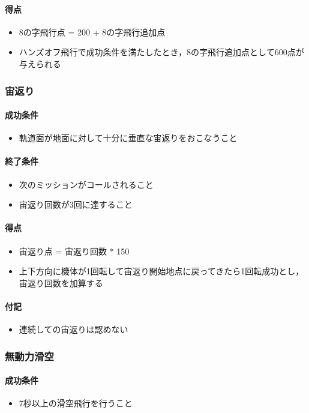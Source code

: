 \paragraph{得点}
\begin{itemize}
\item 8の字飛行点 = 200 + 8の字飛行追加点
\item ハンズオフ飛行で成功条件を満たしたとき，8の字飛行追加点として600点が与えられる
\end{itemize}
\subsubsection{宙返り}
\paragraph{成功条件}
\begin{itemize}
\item 軌道面が地面に対して十分に垂直な宙返りをおこなうこと
\end{itemize}
\paragraph{終了条件}
\begin{itemize}
\item 次のミッションがコールされること
\item 宙返り回数が3回に達すること
\end{itemize}
\paragraph{得点}
\begin{itemize}
\item 宙返り点 = 宙返り回数 * 150
\item 上下方向に機体が1回転して宙返り開始地点に戻ってきたら1回転成功とし，宙返り回数を加算する
\end{itemize}
\paragraph{付記}
\begin{itemize}
\item 連続しての宙返りは認めない
\end{itemize}


\subsubsection{無動力滑空}
\paragraph{成功条件}
\begin{itemize}
\item 7秒以上の滑空飛行を行うこと
\end{itemize}
